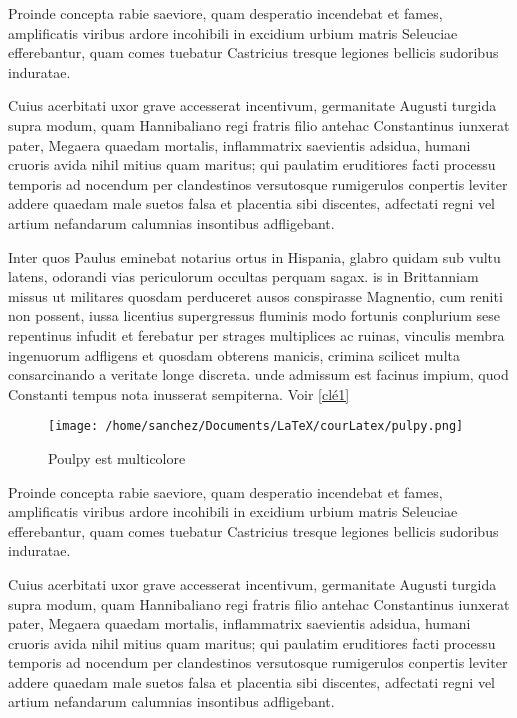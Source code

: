 \documentclass{report}
\begin{document}
Proinde concepta rabie saeviore, quam desperatio incendebat et fames, amplificatis viribus ardore incohibili in excidium urbium matris Seleuciae efferebantur, quam comes tuebatur Castricius tresque legiones bellicis sudoribus induratae.

Cuius acerbitati uxor grave accesserat incentivum, germanitate Augusti turgida supra modum, quam Hannibaliano regi fratris filio antehac Constantinus iunxerat pater, Megaera quaedam mortalis, inflammatrix saevientis adsidua, humani cruoris avida nihil mitius quam maritus; qui paulatim eruditiores facti processu temporis ad nocendum per clandestinos versutosque rumigerulos conpertis leviter addere quaedam male suetos falsa et placentia sibi discentes, adfectati regni vel artium nefandarum calumnias insontibus adfligebant.

\newpage

Inter quos Paulus eminebat notarius ortus in Hispania, glabro quidam sub vultu latens, odorandi vias periculorum occultas perquam sagax. is in Brittanniam missus ut militares quosdam perduceret ausos conspirasse Magnentio, cum reniti non possent, iussa licentius supergressus fluminis modo fortunis conplurium sese repentinus infudit et ferebatur per strages multiplices ac ruinas, vinculis membra ingenuorum adfligens et quosdam obterens manicis, crimina scilicet multa consarcinando a veritate longe discreta. unde admissum est facinus impium, quod Constanti tempus nota inusserat sempiterna.
Voir \ref {clé1}


\begin{figure}[hb]
\begin{center}
\texttt{[image: /home/sanchez/Documents/LaTeX/courLatex/pulpy.png]} 
\end{center}
\caption{Poulpy est multicolore}
\label{Poulpy est multicolore}
\end{figure}


Proinde concepta rabie saeviore, quam desperatio incendebat et fames, amplificatis viribus ardore incohibili in excidium urbium matris Seleuciae efferebantur, quam comes tuebatur Castricius tresque legiones bellicis sudoribus induratae.

Cuius acerbitati uxor grave accesserat incentivum, germanitate Augusti turgida supra modum, quam Hannibaliano regi fratris filio antehac Constantinus iunxerat pater, Megaera quaedam mortalis, inflammatrix saevientis adsidua, humani cruoris avida nihil mitius quam maritus; qui paulatim eruditiores facti processu temporis ad nocendum per clandestinos versutosque rumigerulos conpertis leviter addere quaedam male suetos falsa et placentia sibi discentes, adfectati regni vel artium nefandarum calumnias insontibus adfligebant.
\end{document}
